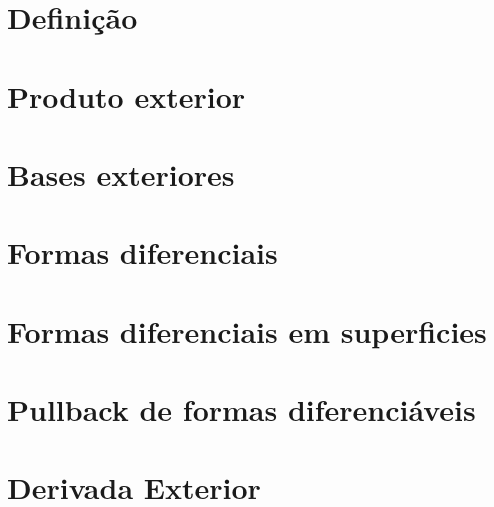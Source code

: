 \section{Definição}

\section{Produto exterior}

\section{Bases exteriores}

\section{Formas diferenciais}

\section{Formas diferenciais em superficies}

\section{Pullback de formas diferenciáveis}

\section{Derivada Exterior}

